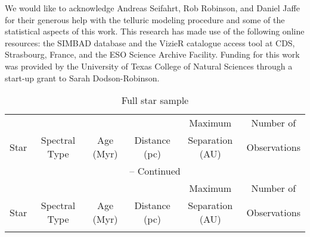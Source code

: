 \documentclass[11pt]{report}     %
\begin{document}
We would like to acknowledge Andreas Seifahrt, Rob Robinson, and Daniel Jaffe for their generous help with the telluric modeling 
procedure and some of the statistical aspects of this work. This 
research has made use of the 
following online resources: the SIMBAD database and the VizieR
catalogue access tool at CDS, Strasbourg, France, and the ESO Science 
Archive Facility. Funding for this work was provided by the University
of Texas College of Natural Sciences through a start-up grant to Sarah Dodson-Robinson.



\begin{center}
\begin{small}
\begin{longtable}[h]{|cccccc|}




    \caption{Full star sample} \\
        \hline
       & & & & Maximum & Number of \\ Star & Spectral Type & Age (Myr) & Distance
       (pc) & Separation (AU) & Observations \\ \hline
        \endfirsthead

        \multicolumn{6}{c}{{\tablename} \thetable{} -- Continued} \\
        \hline
         & & & & Maximum & Number of \\ Star & Spectral Type & Age (Myr) & Distance
       (pc) & Separation (AU) & Observations \\ \hline
        \endhead

        \hline
        \endfoot

        \hline
        \endlastfoot


\end{longtable}
\end{small}
\end{center}
\end{document}
